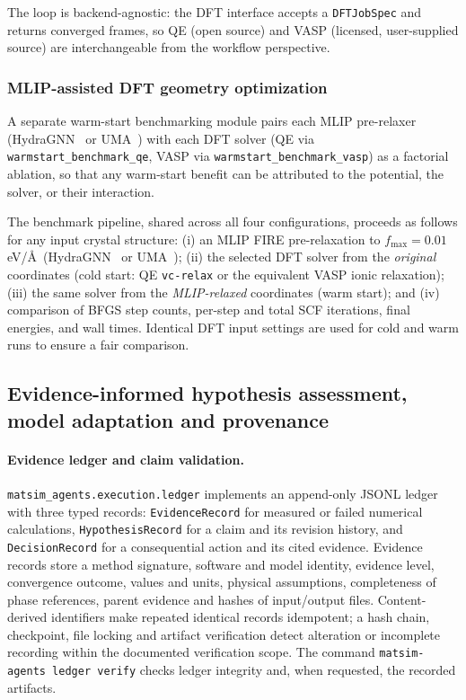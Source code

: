 \documentclass[11pt,a4paper]{article}
\def\ac#1{#1}%
\begin{document}
The loop is backend-agnostic: the \ac{DFT} interface accepts a
\texttt{DFTJobSpec} and returns converged frames, so \ac{QE} (open source) and
\ac{VASP} (licensed, user-supplied source) are interchangeable from the workflow
perspective.

\subsubsection{MLIP-assisted DFT geometry optimization}
A separate warm-start benchmarking module pairs each \ac{MLIP} pre-relaxer
(HydraGNN~\cite{hydragnn} or UMA~\cite{wood2025uma}) with each \ac{DFT} solver
(\ac{QE} via \texttt{warmstart\_benchmark\_qe}, \ac{VASP} via
\texttt{warmstart\_benchmark\_vasp}) as a factorial ablation, so that any
warm-start benefit can be attributed to the potential, the solver, or their
interaction.

The benchmark pipeline, shared across all four configurations, proceeds as follows
for any input crystal structure: (i) an \ac{MLIP} \ac{FIRE} pre-relaxation to
$f_\text{max} = 0.01$\,eV/\AA\ (HydraGNN~\cite{hydragnn} or UMA~\cite{wood2025uma});
(ii) the selected \ac{DFT} solver from the \emph{original} coordinates (cold
start: \ac{QE} \texttt{vc-relax} or the equivalent \ac{VASP} ionic relaxation);
(iii) the same solver from the \emph{\ac{MLIP}-relaxed} coordinates (warm start);
and (iv) comparison of \ac{BFGS} step counts, per-step and total \ac{SCF}
iterations, final energies, and wall times. Identical \ac{DFT} input settings are
used for cold and warm runs to ensure a fair comparison.


\subsection{Evidence-informed hypothesis assessment, model adaptation and provenance}

\paragraph{Evidence ledger and claim validation.}
\texttt{matsim\_agents.execution.ledger} implements an append-only \ac{JSONL} ledger with three typed records: \texttt{EvidenceRecord} for measured or failed numerical calculations, \texttt{HypothesisRecord} for a claim and its revision history, and \texttt{DecisionRecord} for a consequential action and its cited evidence. Evidence records store a method signature, software and model identity, evidence level, convergence outcome, values and units, physical assumptions, completeness of phase references, parent evidence and hashes of input/output files. Content-derived identifiers make repeated identical records idempotent; a hash chain, checkpoint, file locking and artifact verification detect alteration or incomplete recording within the documented verification scope. The command \texttt{matsim-agents ledger verify} checks ledger integrity and, when requested, the recorded artifacts.
\end{document}
